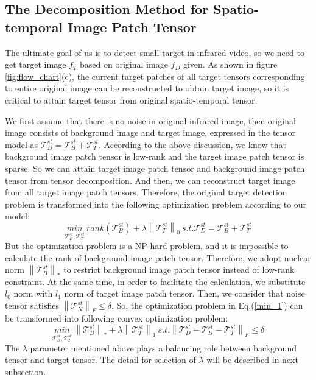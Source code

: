 \documentclass[journal]{IEEEtran}
\begin{document}
\subsection{The Decomposition Method for Spatio-temporal Image Patch Tensor}
The ultimate goal of us is to detect small target in infrared video, so we need to get target image $f_T$ based on original image $f_D$ given. As shown in figure \ref{fig:flow_chart}(c), the current target patches of all target tensors corresponding to entire original image can be reconstructed to obtain target image, so it is critical to attain target tensor from original spatio-temporal tensor.

We first assume that there is no noise in original infrared image, then original image consists of background image and target image, expressed in the tensor model as $\bm{\mathcal T}_D^{st}=\bm{\mathcal T}_B^{st}+\bm{\mathcal T}_T^{st}$. According to the above discussion, we know that background image patch tensor is low-rank and the target image patch tensor is sparse. So we can attain target image patch tensor and background image patch tensor from tensor decomposition. And then, we can reconstruct target image from all target image patch tensors. Therefore, the original target detection problem is transformed into the following optimization problem according to our model:
\begin{equation}
  \underset{\bm{\mathcal T}_B^{st},\bm{\mathcal T}_T^{st}}{min} \ rank(\bm{\mathcal T}_B^{st}) + \lambda \left \| \bm{\mathcal T}_T^{st} \right \|_0 \ s.t. \bm{\mathcal T}_D^{st}=\bm{\mathcal T}_B^{st}+\bm{\mathcal T}_T^{st}
  \label{min_1}
\end{equation}
But the optimization problem is a NP-hard problem, and it is impossible to calculate the rank of background image patch tensor. Therefore, we adopt nuclear norm $\left \| \bm{\mathcal T}_B^{st} \right \|_*$ to restrict background image patch tensor instead of low-rank constraint. At the same time, in order to facilitate the calculation, we substitute $l_0$ norm with $l_1$ norm of target image patch tensor. Then, we consider that noise tensor satisfies $\left \| \bm{\mathcal T}_N^{st}\right \|_F \leq \delta$. So, the optimization problem in Eq.(\ref{min_1}) can be transformed into following convex optimization problem:
\begin{equation}
  \underset{\bm{\mathcal T}_B^{st},\bm{\mathcal T}_T^{st}}{min} \ \left \| \bm{\mathcal T}_B^{st} \right \|_* + \lambda \left \| \bm{\mathcal T}_T^{st} \right \|_1 \ s.t. \left \|\bm{\mathcal T}_D^{st}-\bm{\mathcal T}_B^{st}-\bm{\mathcal T}_T^{st} \right \|_F\leq \delta
  \label{min_2}
\end{equation}
The $\lambda$ parameter mentioned above plays a balancing role between background tensor and target tensor. The detail for selection of $\lambda$ will be described in next subsection.
\end{document}
